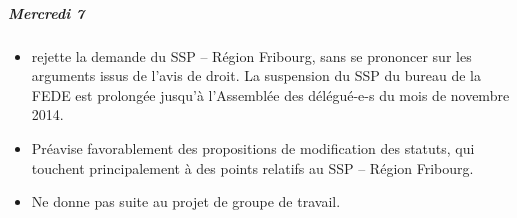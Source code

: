 \subparagraph{Mercredi 7}%
\begin{itemize}
	\item rejette la demande du SSP – Région Fribourg, sans se prononcer sur les arguments issus de l'avis de droit. La suspension du SSP du bureau de la FEDE est prolongée jusqu'à l'Assemblée des délégué-e-s du mois de novembre 2014.
	\item Préavise favorablement des propositions de modification des statuts, qui touchent principalement à des points relatifs au SSP – Région Fribourg.
	\item Ne donne pas suite au projet de groupe de travail.
\end{itemize}










